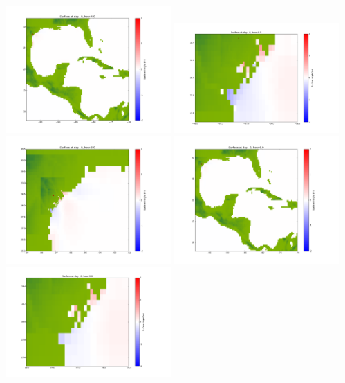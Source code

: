 \documentclass[11pt]{article}
\begin{document}
\vskip 10pt 
\includegraphics[width=0.475\textwidth]{frame0026fig1003.png}
\vskip 10pt 
\includegraphics[width=0.475\textwidth]{frame0027fig1001.png}
\includegraphics[width=0.475\textwidth]{frame0027fig1002.png}
\vskip 10pt 
\includegraphics[width=0.475\textwidth]{frame0027fig1003.png}
\vskip 10pt 
\includegraphics[width=0.475\textwidth]{frame0028fig1001.png}
\end{document}
